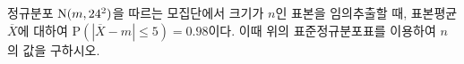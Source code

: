 \noindent\begin{minipage}[t]{0.58\linewidth}\vspace{0pt}\raggedright 정규분포 $\mathrm{N}(m{,}\mkern3mu\mathopen{}24^2)$을 따르는 모집단에서 크기가 $n$인 표본을 임의추출할 때, 표본평균 $\overline{X}$에 대하여 $\mathrm{P}(|\overline{X}-m|\le 5)=0.98$이다. 이때 위의 표준정규분포표를 이용하여 $n$의 값을 구하시오.\end{minipage}\hfill\begin{minipage}[t]{0.4\linewidth}\vspace{0pt}\centering \resizebox{\ifdim\width>\linewidth\linewidth\else\width\fi}{!}{}\end{minipage}\par
